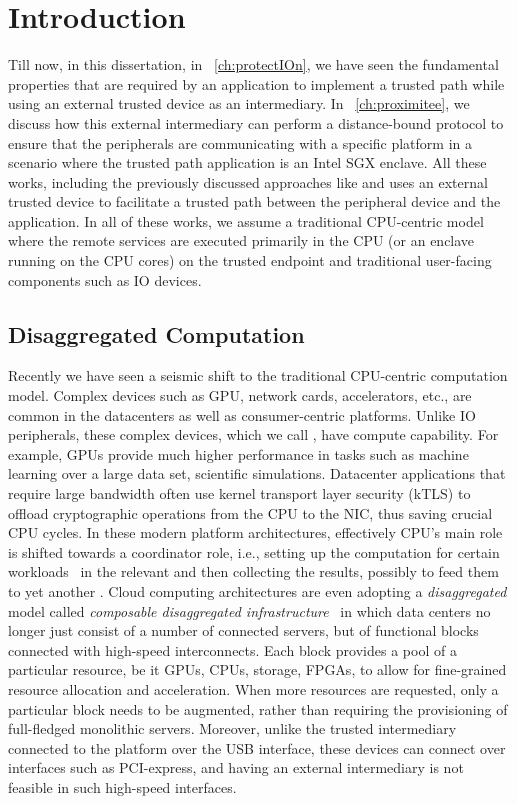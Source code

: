 \section{Introduction}
\label{sec: intro}


Till now, in this dissertation, in \protection~\ref{ch:protectIOn}, we have seen the fundamental properties that are required by an application to implement a trusted path while using an external trusted device as an intermediary. In \proximitee~\ref{ch:proximitee}, we discuss how this external intermediary can perform a distance-bound protocol to ensure that the peripherals are communicating with a specific platform in a scenario where the trusted path application is an Intel SGX enclave. All these works, including the previously discussed approaches like \integrikey and \integriscreen uses an external trusted device to facilitate a trusted path between the peripheral device and the application. In all of these works, we assume a traditional CPU-centric model where the remote services are executed primarily in the CPU (or an enclave running on the CPU cores) on the trusted endpoint and traditional user-facing components such as IO devices.

\subsection{Disaggregated Computation}

Recently we have seen a seismic shift to the traditional CPU-centric computation model. Complex devices such as GPU, network cards, accelerators, etc., are common in the datacenters as well as consumer-centric platforms. Unlike IO peripherals, these complex devices, which we call \sphw, have compute capability. For example, GPUs provide much higher performance in tasks such as machine learning over a large data set, scientific simulations. Datacenter applications that require large bandwidth often use kernel transport layer security (kTLS) to offload cryptographic operations from the CPU to the NIC, thus saving crucial CPU cycles. In these modern platform architectures, effectively CPU's main role is shifted towards a coordinator role, i.e., setting up the computation for certain workloads~\cite{spec_hw_acc} in the relevant \sphw and then collecting the results, possibly to feed them to yet another \sphw. Cloud computing architectures are even adopting a \emph{disaggregated} model called \emph{composable disaggregated infrastructure}~\cite{disaggregatedcomp,fungible,meyer2017disaggregated,lim2009disaggregated} in which data centers no longer just consist of a number of connected servers, but of functional blocks connected with high-speed interconnects. Each block provides a pool of a particular resource, be it GPUs, CPUs, storage, FPGAs, to allow for fine-grained resource allocation and acceleration. When more resources are requested, only a particular block needs to be augmented, rather than requiring the provisioning of full-fledged monolithic servers. Moreover, unlike the trusted intermediary connected to the platform over the USB interface, these \sphw devices can connect over interfaces such as PCI-express, and having an external intermediary is not feasible in such high-speed interfaces. 



